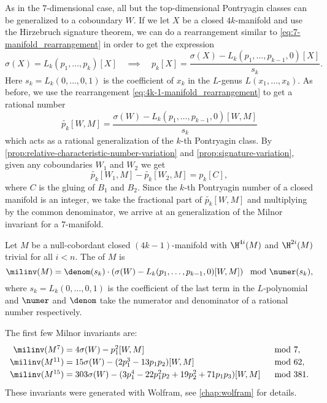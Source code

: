 As in the $7$-dimensional case, all but the top-dimensional Pontryagin classes can be generalized to a coboundary $W$.
If we let $X$ be a closed $4k$-manifold and use the Hirzebruch signature theorem, we can do a rearrangement similar to \cref{eq:7-manifold_rearrangement} in order to get the expression
\begin{equation}\label{eq:4k-1-manifold_rearrangement}
	\sigma(X) = L_k(p_1, \ldots, p_k)[X]\quad\implies\quad
	p_k[X] = \frac{\sigma(X) - L_k(p_1,\ldots, p_{k-1}, 0)[X]}{s_k}.
\end{equation}
Here $s_k=L_k(0,\ldots, 0, 1)$ is the coefficient of $x_k$ in the $L$-genus $L(x_1,\ldots, x_k)$.
As before, we use the rearrangement \cref{eq:4k-1-manifold_rearrangement} to get a rational number
\[
	\widetilde{p_k}[W, M] = \frac{\sigma(W) - L_k(p_1,\ldots, p_{k-1}, 0)[W,M]}{s_k}
\]
which acts as a rational generalization of the $k$-th Pontryagin class. By \cref{prop:relative-characteristic-number-variation} and \cref{prop:signature-variation}, given any coboundaries $W_1$ and $W_2$ we get
\[
	\widetilde{p_k}[W_1, M] - \widetilde{p_k}[W_2, M] = p_k[C],
\]
where $C$ is the gluing of $B_1$ and $B_2$. Since the $k$-th Pontryagin number of a closed manifold is an integer, we take the fractional part of $\widetilde{p_k}[W,M]$ and multiplying by the common denominator, we arrive at an generalization of the Milnor invariant for a $7$-manifold.

\begin{definition}
	Let $M$ be a null-cobordant closed $(4k-1)$-manifold with $\H^{4i}(M)$ and $\H^{2i}(M)$ trivial for all $i<n$. The  of $M$ is
	\[
		\milinv(M) = \denom(s_k)\cdot \left(\sigma(W) - L_k(p_1, \ldots, p_{k-1},0)[W,M]\right)\mod \numer(s_k),
	\]
	where $s_k = L_k(0,\ldots,0,1)$ is the coefficient of the last term in the $L$-polynomial and $\numer$ and $\denom$ take the numerator and denominator of a rational number respectively.
\end{definition}

\begin{example}
	The first few Milnor invariants are:
	\[
		\renewcommand{\arraystretch}{1.2}
		\begin{array}{r@{\;}ll}
			\milinv(M^7)
			 & = 4\sigma(W) - p_1^2[W, M]
			 & \mod 7,                                                        \\
			\milinv(M^{11})
			 & = 15\sigma(W) - (2p_1^3-13p_1p_2)[W,M]
			 & \mod 62,                                                       \\
			\milinv(M^{15})
			 & = 303\sigma(W) - (3p_1^4-22p_1^2p_2 + 19p_2^2 + 71p_1p_3)[W,M]
			 & \mod 381.
		\end{array}
	\]
	These invariants were generated with Wolfram, see \cref{chap:wolfram} for details.
\end{example}

